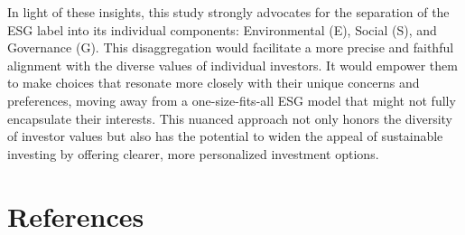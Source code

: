 \documentclass[
  12pt,
]{article}
\begin{document}
In light of these insights, this study strongly advocates for the separation of the ESG label into its individual components: Environmental (E), Social (S), and Governance (G). This disaggregation would facilitate a more precise and faithful alignment with the diverse values of individual investors. It would empower them to make choices that resonate more closely with their unique concerns and preferences, moving away from a one-size-fits-all ESG model that might not fully encapsulate their interests. This nuanced approach not only honors the diversity of investor values but also has the potential to widen the appeal of sustainable investing by offering clearer, more personalized investment options.

\hypertarget{references}{%
\section*{References}\label{references}}
\end{document}
